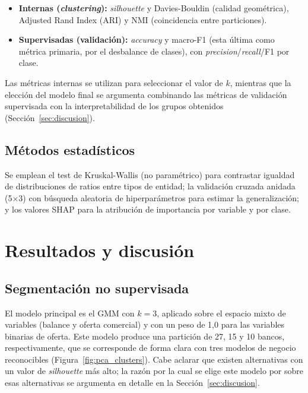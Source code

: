 \documentclass[11pt,a4paper]{article}
\begin{document}
\begin{itemize}
  \item \textbf{Internas (\textit{clustering}):} \textit{silhouette} y Davies-Bouldin (calidad geométrica),
  Adjusted Rand Index (ARI) y NMI (coincidencia entre particiones).
  \item \textbf{Supervisadas (validación):} \textit{accuracy} y macro-F1 (esta última como métrica primaria,
  por el desbalance de clases), con \textit{precision}/\textit{recall}/F1 por clase.
\end{itemize}
Las métricas internas se utilizan para seleccionar el valor de $k$, mientras que la elección del
modelo final se argumenta combinando las métricas de validación supervisada con la interpretabilidad
de los grupos obtenidos (Sección~\ref{sec:discusion}).

\subsection{Métodos estadísticos}

Se emplean el test de Kruskal-Wallis (no paramétrico) para contrastar igualdad de distribuciones
de ratios entre tipos de entidad; la validación cruzada anidada (5$\times$3) con búsqueda aleatoria
de hiperparámetros para estimar la generalización; y los valores SHAP para la atribución de
importancia por variable y por clase.

\section{Resultados y discusión}
\label{sec:resultados}

\subsection{Segmentación no supervisada}
\label{sec:res1}

El modelo principal es el GMM con $k=3$, aplicado sobre el espacio mixto de
variables (balance y oferta comercial) y con un peso de 1,0 para las variables binarias de oferta.
Este modelo produce una partición de 27, 15 y 10 bancos, respectivamente, que se corresponde de forma
clara con tres modelos de negocio reconocibles (Figura~\ref{fig:pca_clusters}). Cabe aclarar que existen
alternativas con un valor de \textit{silhouette} más alto; la razón por la cual se elige este modelo por
sobre esas alternativas se argumenta en detalle en la Sección~\ref{sec:discusion}.
\end{document}
